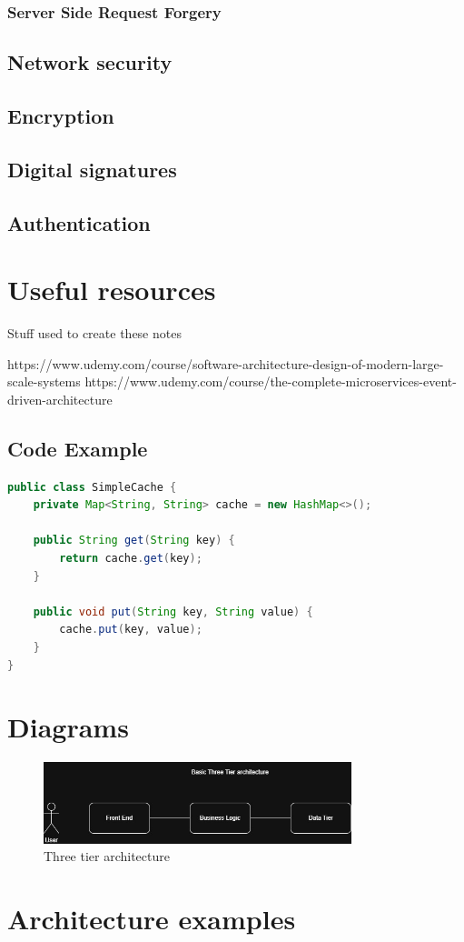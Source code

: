 \documentclass[a4paper, 11pt]{book}
\begin{document}
    \subsection{Server Side Request Forgery}


    \section{Network security}


    \section{Encryption}


    \section{Digital signatures}


    \section{Authentication}


    \chapter{Useful resources}
    Stuff used to create these notes

    https://www.udemy.com/course/software-architecture-design-of-modern-large-scale-systems
    https://www.udemy.com/course/the-complete-microservices-event-driven-architecture

    \newpage



    \section{Code Example}
    \begin{lstlisting}[language=Java, caption=Java Code for a Simple Cache]
public class SimpleCache {
    private Map<String, String> cache = new HashMap<>();

    public String get(String key) {
        return cache.get(key);
    }

    public void put(String key, String value) {
        cache.put(key, value);
    }
}
    \end{lstlisting}


    \chapter{Diagrams}

    \begin{figure}[h]
        \centering
        \includegraphics[width=0.8\textwidth]{basic-architecture} %
        \caption{Three tier architecture}
        \label{fig:drawio-diagram}
    \end{figure}


    \chapter{Architecture examples}
\end{document}
